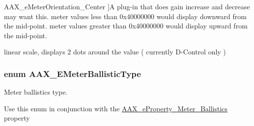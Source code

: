 \begin{Desc}
\begin{description}
{\hypertarget{a00206_af260f0f9a6bff0f7bfd3200b2947c96ba44223d4d984b699078812d37099735ea}{}A\+A\+X\+\_\+e\+Meter\+Orientation\+\_\+\+Center\label{a00206_af260f0f9a6bff0f7bfd3200b2947c96ba44223d4d984b699078812d37099735ea}
}]A plug-\/in that does gain increase and decrease may want this. meter values less than 0x40000000 would display downward from the mid-\/point. meter values greater than 0x40000000 would display upward from the mid-\/point. \item[{\em 
\hypertarget{a00206_af260f0f9a6bff0f7bfd3200b2947c96ba243a20e56fa6161e8ba5130c2ca66f6c}{}A\+A\+X\+\_\+e\+Meter\+Orientation\+\_\+\+Phase\+Dot\label{a00206_af260f0f9a6bff0f7bfd3200b2947c96ba243a20e56fa6161e8ba5130c2ca66f6c}
}]linear scale, displays 2 dots around the value ( currently D-\/\+Control only ) \end{description}
\end{Desc}
\hypertarget{a00206_a9aaedbe356691c4e4584fa7ccdbcc776}{}
\subsubsection[{A\+A\+X\+\_\+\+E\+Meter\+Ballistic\+Type}]{\setlength{\rightskip}{0pt plus 5cm}enum {\bf A\+A\+X\+\_\+\+E\+Meter\+Ballistic\+Type}}\label{a00206_a9aaedbe356691c4e4584fa7ccdbcc776}


Meter ballistics type. 

Use this enum in conjunction with the \hyperlink{a00283_a6571f4e41a5dd06e4067249228e2249eaa8bb492770af0bde7e4ce23184928a63}{A\+A\+X\+\_\+e\+Property\+\_\+\+Meter\+\_\+\+Ballistics} property

